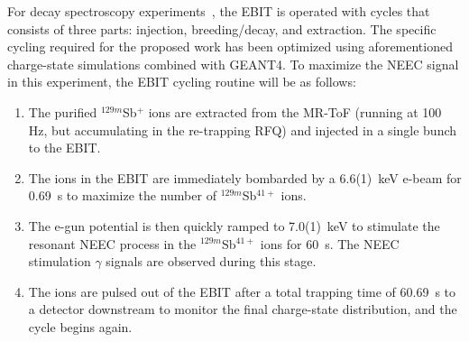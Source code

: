 \documentclass[12pt]{article}
\begin{document}
\begin{comment}
\begin{figure}[t!]
\begin{center}
\texttt{[image: MIscheme.png]}
\end{center}
\caption{\label{MIscheme}Schematic of the trapping potentials for (a) single injection and decay and (b) multiple injections before decay.  The single injection trapping scheme uses one cycle of filling the RFQ, injects the bunch into the EBIT, and closes the outermost trap electrode for storage and decay spectroscopy.  The multiple-injection scheme uses successive 25~ms extractions from the RFQ while the charge-bred ions in the EBIT experience a ``deeper" effective potential, and are not lost upon each injection.  After the space-charge limit of the EBIT is reached, the outermost electrode is raised for storage and decay spectroscopy~\cite{Kla15,Lea15b}.}
\end{figure}
\end{comment}

For decay spectroscopy experiments~\cite{Len14,Lea15b,Lea15c,Lea17}, the EBIT is operated with cycles that consists of three parts: injection, breeding/decay, and extraction.  The specific cycling required for the proposed work has been optimized using aforementioned charge-state simulations combined with GEANT4.  To maximize the NEEC signal in this experiment, the EBIT cycling routine will be as follows:
\begin{enumerate}
    \item The purified $^{129m}$Sb$^+$ ions are extracted from the MR-ToF (running at 100 Hz, but accumulating in the re-trapping RFQ) and injected in a single bunch to the EBIT.
    \vspace{-8pt}
    \item The ions in the EBIT are immediately bombarded by a 6.6(1)~keV e-beam for 0.69~s to maximize the number of $^{129m}$Sb$^{41+}$ ions.
    \vspace{-8pt}
    \item The e-gun potential is then quickly ramped to 7.0(1)~keV to stimulate the resonant NEEC process in the $^{129m}$Sb$^{41+}$ ions for 60~s.  The NEEC stimulation $\gamma$ signals are observed during this stage.
    \vspace{-8pt}
    \item The ions are pulsed out of the EBIT after a total trapping time of 60.69~s to a detector downstream to monitor the final charge-state distribution, and the cycle begins again.
\end{enumerate}
\end{document}
